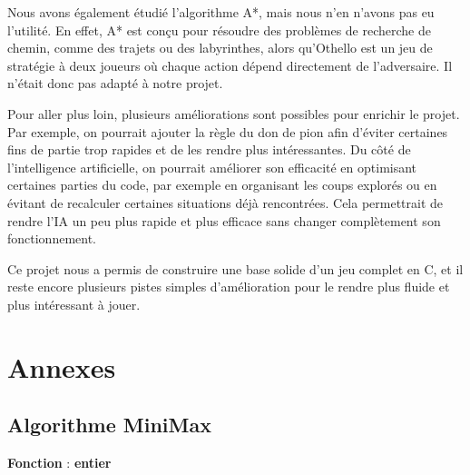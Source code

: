 \documentclass{article}
\begin{document}
Nous avons également étudié l'algorithme A*, mais nous n'en n'avons pas eu l'utilité. En effet, A* est conçu pour résoudre des problèmes de recherche de chemin, comme des trajets ou des labyrinthes, alors qu'Othello est un jeu de stratégie à deux joueurs où chaque action dépend directement de l'adversaire. Il n'était donc pas adapté à notre projet.

Pour aller plus loin, plusieurs améliorations sont possibles pour enrichir le projet. Par exemple, on pourrait ajouter la règle du don de pion afin d'éviter certaines fins de partie trop rapides et de les rendre plus intéressantes. Du côté de l'intelligence artificielle, on pourrait  améliorer son efficacité en optimisant certaines parties du code, par exemple en organisant les coups explorés ou en évitant de recalculer certaines situations déjà rencontrées. Cela permettrait de rendre l'IA un peu plus rapide et plus efficace sans changer complètement son fonctionnement.

Ce projet nous a permis de construire une base solide d'un jeu complet en C, et il reste encore plusieurs pistes simples d'amélioration pour le rendre plus fluide et plus intéressant à jouer.

\newpage

\section{\textbf{Annexes}}
\medskip

\subsection{Algorithme MiniMax}
\label{alg:minimax}

\begin{algorithm}[H]
\SetAlgoLined %
\DontPrintSemicolon %


\BlankLine
\textbf{Fonction}  : \textbf{entier}\;
\caption{Algorithme Minimax}
\end{algorithm}
\end{document}
